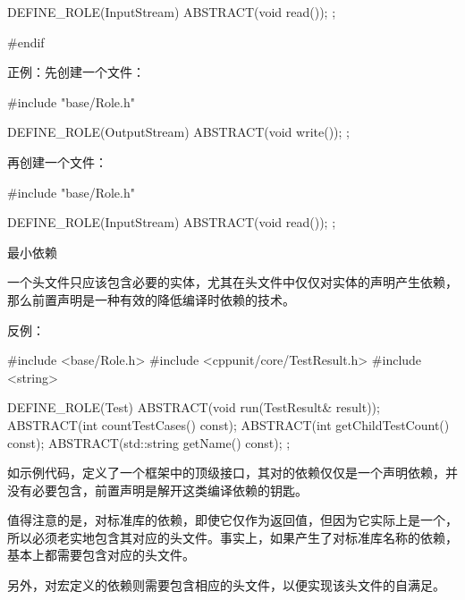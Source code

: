 \begin{content}
\begin{leftbar}
\begin{c++}
DEFINE_ROLE(InputStream)
{
    ABSTRACT(void read());
};

#endif
\end{c++}
\end{leftbar}

正例：先创建一个文件：
\begin{leftbar}
\begin{c++}
#include "base/Role.h"

DEFINE_ROLE(OutputStream)
{
    ABSTRACT(void write());
};
\end{c++}
\end{leftbar}

再创建一个文件：

\begin{leftbar}
\begin{c++}
#include "base/Role.h"

DEFINE_ROLE(InputStream)
{
    ABSTRACT(void read());
};

\end{c++}
\end{leftbar}

\begin{principle}
最小依赖
\end{principle}

一个头文件只应该包含必要的实体，尤其在头文件中仅仅对实体的声明产生依赖，那么前置声明是一种有效的降低编译时依赖的技术。

反例：
\begin{leftbar}
\begin{c++}
#include <base/Role.h>
#include <cppunit/core/TestResult.h>
#include <string>

DEFINE_ROLE(Test)
{
    ABSTRACT(void run(TestResult& result));
    ABSTRACT(int countTestCases() const);
    ABSTRACT(int getChildTestCount() const);
    ABSTRACT(std::string getName() const);
};
\end{c++}
\end{leftbar}

如示例代码，定义了一个框架中的顶级接口，其对的依赖仅仅是一个声明依赖，并没有必要包含，前置声明是解开这类编译依赖的钥匙。

值得注意的是，对标准库的依赖，即使它仅作为返回值，但因为它实际上是一个，所以必须老实地包含其对应的头文件。事实上，如果产生了对标准库名称的依赖，基本上都需要包含对应的头文件。

另外，对宏定义的依赖则需要包含相应的头文件，以便实现该头文件的自满足。


\end{content}
